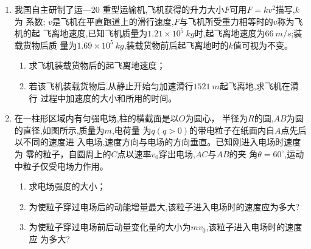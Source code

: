 \begin{enumerate}





\newpage

\gaokaojs


\item 
我国自主研制了运---20 重型运输机,飞机获得的升力大小$ F $可用$ F=kv^{2} $描写,$ k $为
系数; $ v $是飞机在平直跑道上的滑行速度,$ F $与飞机所受重力相等时的$ v $称为飞机的起
飞离地速度,已知飞机质量为$ 1.21 \times 10^{5} \ kg $时,起飞离地速度为$ 66 \ m/s $;装载货物后质
量为$ 1.69 \times 10^{5} \ kg $,装载货物前后起飞离地时的$ k $值可视为不变。

\begin{enumerate}
\item
求飞机装载货物后的起飞离地速度；
\item 
若该飞机装载货物后,从静止开始匀加速滑行$ 1521 \ m $起飞离地,求飞机在滑行
过程中加速度的大小和所用的时间。





\end{enumerate}





\item 
在一柱形区域内有匀强电场,柱的横截面是以$ O $为圆心，
半径为$ R $的圆,$ AB $为圆的直径,如图所示,质量为$ m $,电荷量
为$ q(q>0) $的带电粒子在纸面内自$ A $点先后以不同的速度进
入电场,速度方向与电场的方向垂直。已知刚进入电场时速度为
零的粒子，自圆周上的$ C $点以速率$ v_{0} $穿出电场,$ AC $与$ AB $的夹
角$ \theta=60 ^{ \circ } $,运动中粒子仅受电场力作用。
\begin{enumerate}
\item
求电场强度的大小；
\item 
为使粒子穿过电场后的动能增量最大,该粒子进入电场时的速度应为多大?
\item 
为使粒子穿过电场前后动量变化量的大小为$ mv_{0} $,该粒子进入电场时的速度应
为多大?





\end{enumerate}
\end{enumerate}
